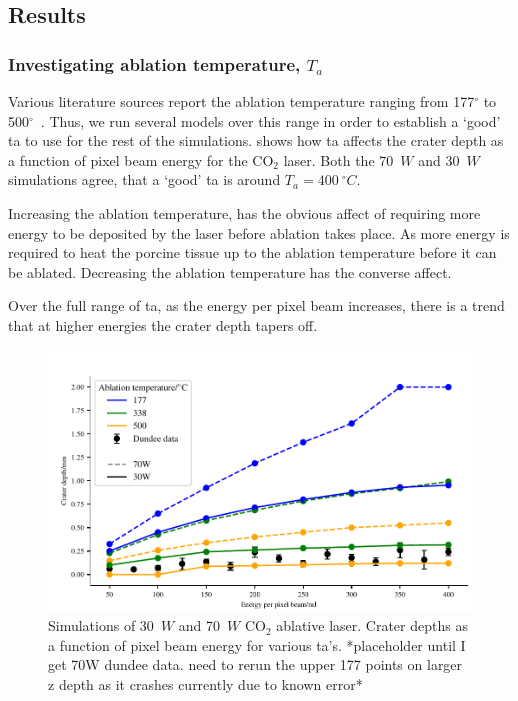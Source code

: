 \subsection{Results}

\subsubsection{Investigating ablation temperature, \texorpdfstring{$T_a$}{Ta}}

Various literature sources report the ablation temperature ranging from 177$^{\circ}$ to 500$^{\circ}$~\cite{gerstmann1994char,mckenzie1986three}. Thus, we run several models over this range in order to establish a `good' \gls{ta} to use for the rest of the simulations.  shows how \gls{ta} affects the crater depth as a function of pixel beam energy for the CO$_2$ laser. Both the 70~$W$ and 30~$W$ simulations agree, that a `good' \gls{ta} is around $T_a=400~^{\circ}C$.

Increasing the ablation temperature, has the obvious affect of requiring more energy to be deposited by the laser before ablation takes place. As more energy is required to heat the porcine tissue up to the ablation temperature before it can be ablated. Decreasing the ablation temperature has the converse affect.

Over the full range of \gls{ta}, as the energy per pixel beam increases, there is a trend that at higher energies the crater depth tapers off.  


\begin{figure}
	\centering
    \includegraphics[width=\columnwidth]{./ablation/images/both.pdf}
    \caption{Simulations of 30~$W$ and 70~$W$ CO$_2$ ablative laser. Crater depths as a function of pixel beam energy for various \gls{ta}'s. *placeholder until I get 70W dundee data. need to rerun the upper 177 points on larger z depth as it crashes currently due to known error*}\label{fig:ta}
\end{figure}
 

